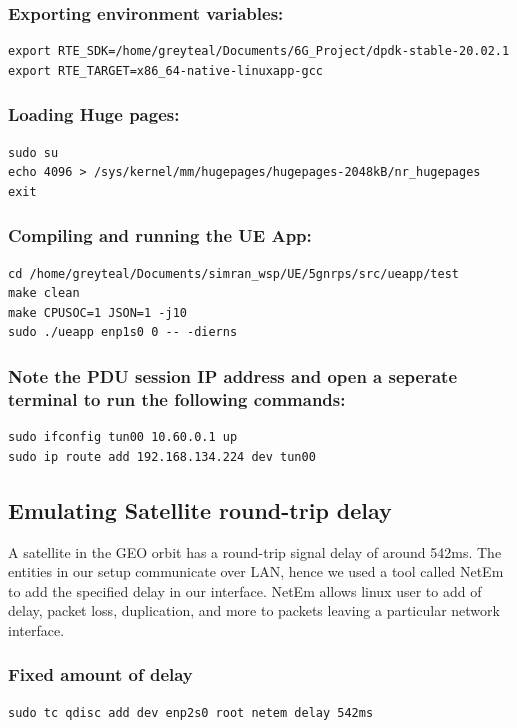\subsubsection{Exporting environment variables:}
\begin{lstlisting}
export RTE_SDK=/home/greyteal/Documents/6G_Project/dpdk-stable-20.02.1
export RTE_TARGET=x86_64-native-linuxapp-gcc
\end{lstlisting}

\subsubsection{Loading Huge pages:}
\begin{lstlisting}
sudo su
echo 4096 > /sys/kernel/mm/hugepages/hugepages-2048kB/nr_hugepages
exit
\end{lstlisting}

\subsubsection{Compiling and running the UE App:}
\begin{lstlisting}
cd /home/greyteal/Documents/simran_wsp/UE/5gnrps/src/ueapp/test
make clean
make CPUSOC=1 JSON=1 -j10
sudo ./ueapp enp1s0 0 -- -dierns
\end{lstlisting}

\subsubsection{Note the PDU session IP address and open a seperate terminal to run the following commands:}
\begin{lstlisting}
sudo ifconfig tun00 10.60.0.1 up
sudo ip route add 192.168.134.224 dev tun00
\end{lstlisting}


\subsection{Emulating Satellite round-trip delay}
\label{Emulating_Satellite_roundtrip_delay}
A satellite in the GEO orbit has a round-trip signal delay of around 542ms. The entities in our setup communicate over LAN, hence we used a tool called NetEm to add the specified delay in our interface. NetEm allows linux user to add of delay, packet loss, duplication, and more to packets leaving a particular network interface.
\subsubsection{Fixed amount of delay}
	\begin{lstlisting}
sudo tc qdisc add dev enp2s0 root netem delay 542ms
\end{lstlisting}
